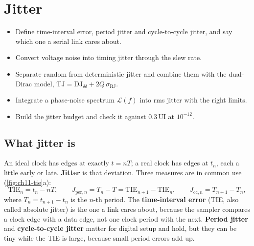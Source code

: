 \chapter{Jitter}\label{ch:jitter}

\begin{objectives}
\begin{itemize}
  \item Define time-interval error, period jitter and cycle-to-cycle jitter, and say which one a serial link cares about.
  \item Convert voltage noise into timing jitter through the slew rate.
  \item Separate random from deterministic jitter and combine them with the dual-Dirac model, $\mathrm{TJ} = \mathrm{DJ}_{\delta\delta} + 2Q\,\sigma_\mathrm{RJ}$.
  \item Integrate a phase-noise spectrum $\mathcal{L}(f)$ into rms jitter with the right limits.
  \item Build the \OS{} jitter budget and check it against 0.3\,UI at $10^{-12}$.
\end{itemize}
\end{objectives}

\section{What jitter is}\label{sec:jitter-defs}

An ideal clock has edges at exactly $t = nT$; a real clock has edges at $t_n$, each a little early or late. \textbf{Jitter} is that deviation. Three measures are in common use (\cref{fig:ch11-tie}a):
\begin{equation}
  \mathrm{TIE}_n = t_n - nT, \qquad
  J_{\mathrm{per},n} = T_n - T = \mathrm{TIE}_{n+1} - \mathrm{TIE}_n, \qquad
  J_{\mathrm{cc},n} = T_{n+1} - T_n ,
  \label{eq:ch11-tie}
\end{equation}
where $T_n = t_{n+1} - t_n$ is the $n$-th period. The \textbf{time-interval error} (TIE, also called absolute jitter) is the one a link cares about, because the sampler compares a clock edge with a data edge, not one clock period with the next. \textbf{Period jitter} and \textbf{cycle-to-cycle jitter} matter for digital setup and hold, but they can be tiny while the TIE is large, because small period errors add up.


